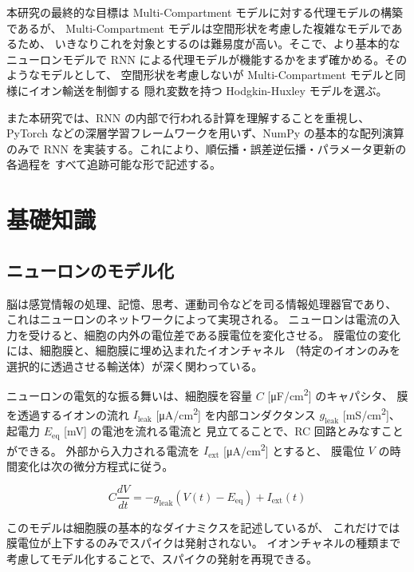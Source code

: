 \documentclass[a4paper,11pt,openany]{ltjsreport}
\newcommand{\Iext}{I_{\mathrm{ext}}}
\newcommand{\gleak}{g_{\mathrm{leak}}}
\newcommand{\Ileak}{I_{\mathrm{leak}}}
\begin{document}
本研究の最終的な目標は Multi-Compartment モデルに対する代理モデルの構築であるが、
Multi-Compartment モデルは空間形状を考慮した複雑なモデルであるため、
いきなりこれを対象とするのは難易度が高い。そこで、より基本的なニューロンモデルで
RNN による代理モデルが機能するかをまず確かめる。そのようなモデルとして、
空間形状を考慮しないが Multi-Compartment モデルと同様にイオン輸送を制御する
隠れ変数を持つ Hodgkin-Huxley モデルを選ぶ\cite{hodgkin1952}。

また本研究では、RNN の内部で行われる計算を理解することを重視し、
PyTorch などの深層学習フレームワークを用いず、NumPy の基本的な配列演算のみで
RNN を実装する。これにより、順伝播・誤差逆伝播・パラメータ更新の各過程を
すべて追跡可能な形で記述する。

\chapter{基礎知識}

\section{ニューロンのモデル化}

脳は感覚情報の処理、記憶、思考、運動司令などを司る情報処理器官であり、
これはニューロンのネットワークによって実現される。
ニューロンは電流の入力を受けると、細胞の内外の電位差である膜電位を変化させる。
膜電位の変化には、細胞膜と、細胞膜に埋め込まれたイオンチャネル
（特定のイオンのみを選択的に透過させる輸送体）が深く関わっている。

ニューロンの電気的な振る舞いは、細胞膜を容量 $C$ [\si{\micro F/cm^2}] のキャパシタ、
膜を透過するイオンの流れ $\Ileak$ [\si{\micro A/cm^2}] を内部コンダクタンス
$\gleak$ [\si{mS/cm^2}]、起電力 $E_{\mathrm{eq}}$ [\si{mV}] の電池を流れる電流と
見立てることで、RC 回路とみなすことができる\cite{miyagawa2013}。
外部から入力される電流を $\Iext$ [\si{\micro A/cm^2}] とすると、
膜電位 $V$ の時間変化は次の微分方程式に従う。

\begin{equation}
  C \frac{dV}{dt} = -\gleak\left(V(t) - E_{\mathrm{eq}}\right) + \Iext(t)
  \label{eq:rc}
\end{equation}

このモデルは細胞膜の基本的なダイナミクスを記述しているが、
これだけでは膜電位が上下するのみでスパイクは発射されない。
イオンチャネルの種類まで考慮してモデル化することで、スパイクの発射を再現できる。
\end{document}
